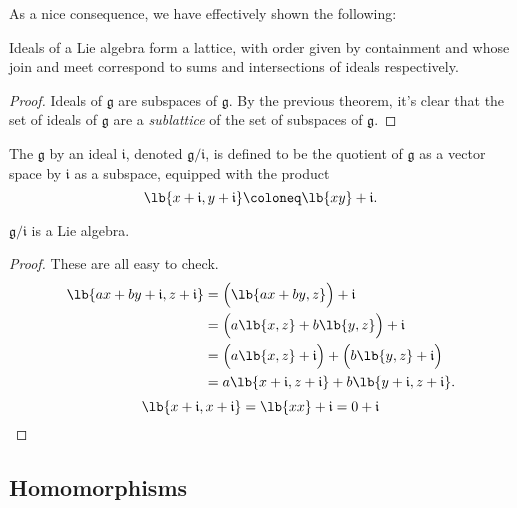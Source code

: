 \documentclass{article}
\DeclarePairedDelimiter\lb\lbrack\rbrack
\newcommand*\frkg{{\ensuremath{\mathfrak{g}}}}
\newcommand*\frki{{\ensuremath{\mathfrak{i}}}}
\begin{document}
As a nice consequence, we have effectively shown the following:

\begin{proposition}
    \label{thm:IdealLattice}
    Ideals of a Lie algebra form a lattice, with order given by containment and whose join and meet correspond to sums and intersections of ideals respectively.
\end{proposition}

\begin{proof}
    Ideals of $\frkg$ are subspaces of $\frkg$.
    By the previous theorem, it's clear that the set of ideals of $\frkg$ are a \textit{sublattice} of the set of subspaces of $\frkg$.
\end{proof}

\begin{definition}
    The  $\frkg$ by an ideal $\frki$, denoted $\frkg/\frki$, is defined to be the quotient of $\frkg$ as a vector space by $\frki$ as a subspace, equipped with the product
    \[
        \lb{x+\frki,y+\frki}
        \coloneq
        \lb{xy} + \frki.
    \]
\end{definition}

\begin{proposition}
    $\frkg/\frki$ is a Lie algebra.
\end{proposition}
\begin{proof}
    These are all easy to check.
    \begin{align*}
        \lb{ax+by+\frki,z+\frki}
        &=
        \Big(\lb{ax+by,z}\Big) + \frki
        \\\
        &=
        \Big(
            a\lb{x,z}  
            +
            b\lb{y,z}  
        \Big)
        + \frki
        \\
        &=
        \Big(
            a\lb{x,z} + \frki
        \Big)
        +
        \Big(
            b\lb{y,z} + \frki 
        \Big)
        \\
        &=
        a\lb{x+\frki,z+\frki} + b\lb{y+\frki,z+\frki}.
    \end{align*}
    \[
        \lb{x+\frki,x+\frki}
        =
        \lb{xx} + \frki
        =
        0 + \frki
    \]
\end{proof}

\newcommand{\barphi}{\ensuremath{\overline{\phi}}}

\subsection{Homomorphisms}
\end{document}
